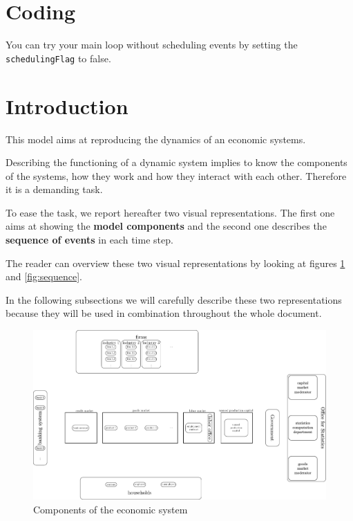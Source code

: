 \documentclass{article}
\begin{document}
\tableofcontents
\section{Coding}
You can try your main loop without scheduling events by setting the \verb+schedulingFlag+ to false.
\section{Introduction}
This model aims at reproducing the dynamics of an economic systems.

Describing the functioning of a dynamic system implies to know the components of the systems, how they work and how they interact with each other. 
Therefore it is a demanding task.

To ease the task, we report hereafter two visual representations. The first one aims at showing the \textbf{model components} and the second one describes the \textbf{sequence of events} in each time step.

The reader can overview these two visual representations by looking at figures \ref{fig:components} and \ref{fig:sequence}.

In the following subsections we will carefully describe these two representations because they will be used in combination throughout the whole document. 

\begin{figure}[htp]
\hskip-1cm\includegraphics[scale=0.5]{agents_and_interactions_figure1.pdf}
	\caption{Components of the economic system}
	\label{fig:components}
\end{figure}
\end{document}
